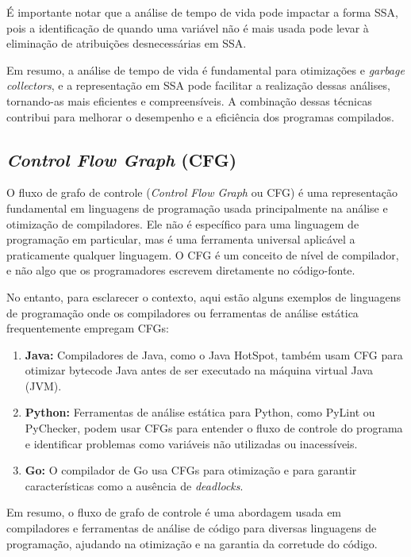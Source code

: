 \documentclass{article}
\begin{document}
    É importante notar que a análise de tempo de vida pode impactar a forma SSA, pois a identificação de quando uma variável não
    é mais usada pode levar à eliminação de atribuições desnecessárias em SSA.

    Em resumo, a análise de tempo de vida é fundamental para otimizações e \emph{garbage collectors}, e a representação em SSA pode
    facilitar a realização dessas análises, tornando-as mais eficientes e compreensíveis. A combinação dessas técnicas contribui
    para melhorar o desempenho e a eficiência dos programas compilados.

    \subsection*{\emph{Control Flow Graph} (CFG)}

    O fluxo de grafo de controle (\emph{Control Flow Graph} ou CFG) é uma representação fundamental em linguagens
    de programação usada principalmente na análise e otimização de compiladores. Ele não é específico para uma
    linguagem de programação em particular, mas é uma ferramenta universal aplicável a praticamente qualquer linguagem.
    O CFG é um conceito de nível de compilador, e não algo que os programadores escrevem diretamente no código-fonte.

    No entanto, para esclarecer o contexto, aqui estão alguns exemplos de linguagens de programação onde os
    compiladores ou ferramentas de análise estática frequentemente empregam CFGs:

    \begin{enumerate}
        \item \textbf{Java:} Compiladores de Java, como o Java HotSpot, também usam CFG para otimizar bytecode Java antes
        de ser executado na máquina virtual Java (JVM).

        \item \textbf{Python:} Ferramentas de análise estática para Python, como PyLint ou PyChecker, podem usar CFGs para entender
        o fluxo de controle do programa e identificar problemas como variáveis não utilizadas ou inacessíveis.

        \item \textbf{Go:} O compilador de Go usa CFGs para otimização e para garantir características como a ausência de
        \emph{deadlocks}.
    \end{enumerate}

    Em resumo, o fluxo de grafo de controle é uma abordagem usada em compiladores e ferramentas de análise de código
    para diversas linguagens de programação, ajudando na otimização e na garantia da corretude do código.
\end{document}
